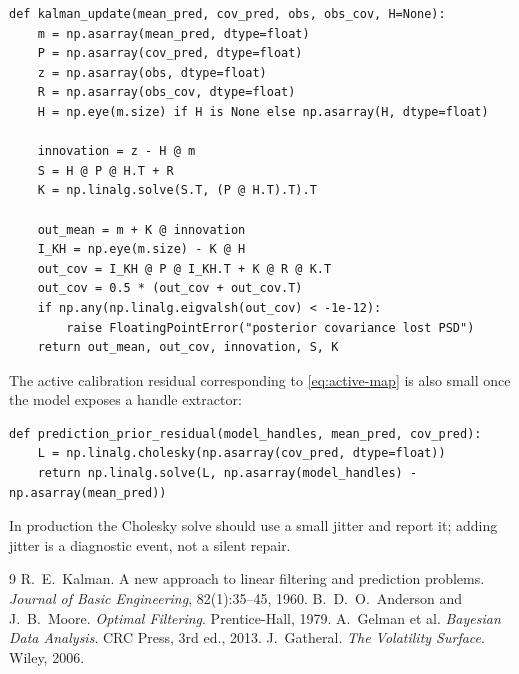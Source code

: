 \documentclass[11pt]{article}
\begin{document}
\begin{lstlisting}[caption={Covariance-form Kalman update with Joseph covariance.}]
def kalman_update(mean_pred, cov_pred, obs, obs_cov, H=None):
    m = np.asarray(mean_pred, dtype=float)
    P = np.asarray(cov_pred, dtype=float)
    z = np.asarray(obs, dtype=float)
    R = np.asarray(obs_cov, dtype=float)
    H = np.eye(m.size) if H is None else np.asarray(H, dtype=float)

    innovation = z - H @ m
    S = H @ P @ H.T + R
    K = np.linalg.solve(S.T, (P @ H.T).T).T

    out_mean = m + K @ innovation
    I_KH = np.eye(m.size) - K @ H
    out_cov = I_KH @ P @ I_KH.T + K @ R @ K.T
    out_cov = 0.5 * (out_cov + out_cov.T)
    if np.any(np.linalg.eigvalsh(out_cov) < -1e-12):
        raise FloatingPointError("posterior covariance lost PSD")
    return out_mean, out_cov, innovation, S, K
\end{lstlisting}

The active calibration residual corresponding to \eqref{eq:active-map} is also
small once the model exposes a handle extractor:

\begin{lstlisting}[caption={Residual rows for the active MAP prediction prior.}]
def prediction_prior_residual(model_handles, mean_pred, cov_pred):
    L = np.linalg.cholesky(np.asarray(cov_pred, dtype=float))
    return np.linalg.solve(L, np.asarray(model_handles) - np.asarray(mean_pred))
\end{lstlisting}

In production the Cholesky solve should use a small jitter and report it; adding
jitter is a diagnostic event, not a silent repair.

\begin{thebibliography}{9}
 R.~E.~Kalman. A new approach to linear filtering and
prediction problems. \emph{Journal of Basic Engineering}, 82(1):35--45, 1960.
 B.~D.~O.~Anderson and J.~B.~Moore.
\emph{Optimal Filtering}. Prentice-Hall, 1979.
 A.~Gelman et al. \emph{Bayesian Data Analysis}. CRC Press,
3rd ed., 2013.
 J.~Gatheral. \emph{The Volatility Surface}. Wiley, 2006.
\end{thebibliography}
\end{document}
